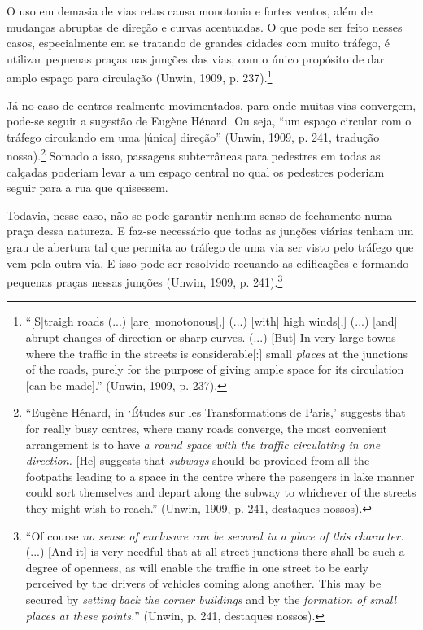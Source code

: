 \documentclass[12pt, a4paper]{book} %
\begin{document}
        O uso em demasia de vias retas causa monotonia e fortes ventos, além de mudanças abruptas de direção e curvas acentuadas. O que pode ser feito nesses casos, especialmente em se tratando de grandes cidades com muito tráfego, é utilizar pequenas praças nas junções das vias, com o único propósito de dar amplo espaço para circulação (Unwin, 1909, p. 237).\footnote[82]{``[S]traigh roads (...) [are] monotonous[,] (...) [with] high winds[,] (...) [and] abrupt changes of direction or sharp curves. (...) [But] In very large towns where the traffic in the streets is considerable[:] small \textit{places} at the junctions of the roads, purely for the purpose of giving ample space for its circulation [can be made].'' (Unwin, 1909, p. 237).}

        Já no caso de centros realmente movimentados, para onde muitas vias convergem, pode-se seguir a sugestão de Eugène Hénard. Ou seja, ``um espaço circular com o tráfego circulando em uma [única] direção'' (Unwin, 1909, p. 241, tradução nossa).\footnote[83]{``Eugène Hénard, in `Études sur les Transformations de Paris,' suggests that for really busy centres, where many roads converge, the most convenient arrangement is to have \textit{a round space with the traffic circulating in one direction.} [He] suggests that \textit{subways} should be provided from all the footpaths leading to a space in the centre where the pasengers in lake manner could sort themselves and depart along the subway to whichever of the streets they might wish to reach.'' (Unwin, 1909, p. 241, destaques nossos).} Somado a isso, passagens subterrâneas para pedestres em todas as calçadas poderiam levar a um espaço central no qual os pedestres poderiam seguir para a rua que quisessem.

        Todavia, nesse caso, não se pode garantir nenhum senso de fechamento numa praça dessa natureza. E faz-se necessário que todas as junções viárias tenham um grau de abertura tal que permita ao tráfego de uma via ser visto pelo tráfego que vem pela outra via. E isso pode ser resolvido recuando as edificações e formando pequenas praças nessas junções (Unwin, 1909, p. 241).\footnote[84]{``Of course \textit{no sense of enclosure can be secured in a \textit{place} of this character.} (...) [And it] is very needful that at all street junctions there shall be such a degree of openness, as will enable the traffic in one street to be early perceived by the drivers of vehicles coming along another. This may be secured by \textit{setting back the corner buildings} and by the \textit{formation of small places at these points.}'' (Unwin, p. 241, destaques nossos).}
\end{document}
